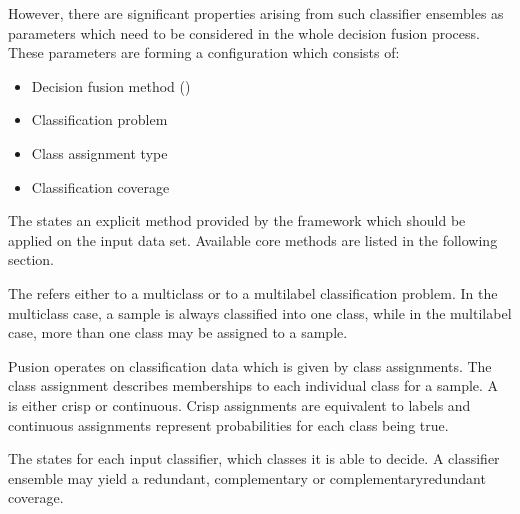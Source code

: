 \documentclass[letterpaper,10pt,english]{sphinxmanual}
\begin{document}
\sphinxAtStartPar
However, there are significant properties arising from such classifier ensembles as parameters which need to be
considered in the whole decision fusion process.
These parameters are forming a configuration which consists of:
\begin{itemize}
\item {} 
\sphinxAtStartPar
Decision fusion method ()

\item {} 
\sphinxAtStartPar
Classification problem

\item {} 
\sphinxAtStartPar
Class assignment type

\item {} 
\sphinxAtStartPar
Classification coverage

\end{itemize}

\sphinxAtStartPar
The  states an explicit method provided by the framework which should be applied on the input data set.
Available core methods are listed in the following section.

\sphinxAtStartPar
The  refers either to a multiclass or to a multilabel classification problem.
In the multiclass case, a sample is always classified into one class, while in the multilabel case, more than one class
may be assigned to a sample.

\sphinxAtStartPar
Pusion operates on classification data which is given by class assignments.
The class assignment describes memberships to each individual class for a sample.
A  is either crisp or continuous. Crisp assignments are equivalent to labels
and continuous assignments represent probabilities for each class being true.

\sphinxAtStartPar
The  states for each input classifier, which classes it is able to decide.
A classifier ensemble may yield a redundant, complementary or complementary\sphinxhyphen{}redundant coverage.
\end{document}
